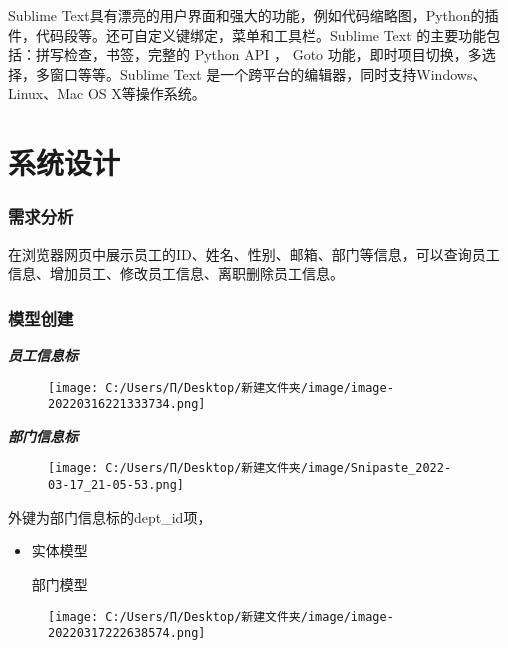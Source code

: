 \documentclass[
]{article}
\begin{document}
Sublime
Text具有漂亮的用户界面和强大的功能，例如代码缩略图，Python的插件，代码段等。还可自定义键绑定，菜单和工具栏。Sublime
Text 的主要功能包括：拼写检查，书签，完整的 Python API ， Goto
功能，即时项目切换，多选择，多窗口等等。Sublime Text
是一个跨平台的编辑器，同时支持Windows、Linux、Mac OS X等操作系统。

\hypertarget{ux7cfbux7edfux8bbeux8ba1}{%
\section{系统设计}\label{ux7cfbux7edfux8bbeux8ba1}}

\hypertarget{ux9700ux6c42ux5206ux6790}{%
\subsubsection{需求分析}\label{ux9700ux6c42ux5206ux6790}}

在浏览器网页中展示员工的ID、姓名、性别、邮箱、部门等信息，可以查询员工信息、增加员工、修改员工信息、离职删除员工信息。

\hypertarget{ux6a21ux578bux521bux5efa}{%
\subsubsection{模型创建}\label{ux6a21ux578bux521bux5efa}}

\emph{\textbf{员工信息标}}

\begin{figure}
\centering
\texttt{[image: C:/Users/Π/Desktop/新建文件夹/image/image-20220316221333734.png]}
\caption{}
\end{figure}

\emph{\textbf{部门信息标}}

\begin{figure}
\centering
\texttt{[image: C:/Users/Π/Desktop/新建文件夹/image/Snipaste\_2022-03-17\_21-05-53.png]}
\caption{}
\end{figure}

外键为部门信息标的dept\_id项，

\begin{itemize}
\item
  实体模型

  部门模型
\end{itemize}

\begin{figure}
\centering
\texttt{[image: C:/Users/Π/Desktop/新建文件夹/image/image-20220317222638574.png]}
\caption{}
\end{figure}
\end{document}
